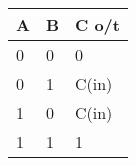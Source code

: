 \begin{tabular}{|l|l|l|} \hline
A & B & C o/t  \\ \hline
0 & 0 & 0      \\
0 & 1 & C(in)  \\
1 & 0 & C(in)  \\
1 & 1 & 1      \\ \hline
\end{tabular}


